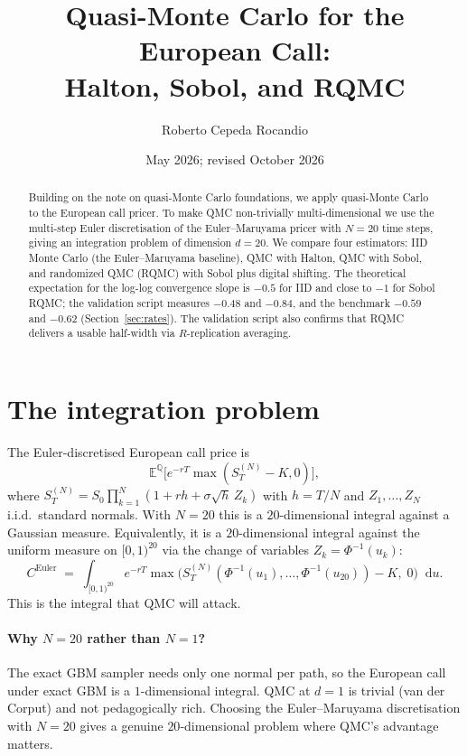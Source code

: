 \documentclass[11pt,a4paper]{article}
\title{Quasi-Monte Carlo for the European Call:\\
       Halton, Sobol, and RQMC}
\author{Roberto Cepeda Rocandio}
\date{May 2026; revised October 2026}
\theoremstyle{plain}
\theoremstyle{definition}
\theoremstyle{remark}
\newcommand{\E}{\mathbb{E}}
\newcommand{\Q}{\mathbb{Q}}
\newcommand{\dd}{\mathop{}\!\mathrm{d}}
\begin{document}
\maketitle

\begin{abstract}
Building on the note on quasi-Monte Carlo foundations, we apply
quasi-Monte Carlo to the European call pricer. To make QMC
non-trivially multi-dimensional we use the multi-step Euler
discretisation of the Euler--Maruyama pricer with $N = 20$ time steps,
giving an integration problem of dimension $d = 20$. We compare four
estimators: IID Monte Carlo (the Euler--Maruyama baseline), QMC with
Halton, QMC with Sobol, and randomized QMC (RQMC) with Sobol plus
digital shifting. The theoretical expectation for the log-log
convergence slope is $-0.5$ for IID and close to $-1$ for Sobol
RQMC; the validation script measures $-0.48$ and $-0.84$, and the
benchmark $-0.59$ and $-0.62$ (Section~\ref{sec:rates}). The
validation script also confirms that RQMC delivers a usable
half-width via $R$-replication averaging.
\end{abstract}

\tableofcontents

\section{The integration problem}
\label{sec:integration-problem}

The Euler-discretised European call price is
\begin{equation}
\E^\Q\bigl[e^{-rT} \max(S_T^{(N)} - K, 0)\bigr],
\end{equation}
where $S_T^{(N)} = S_0 \prod_{k=1}^N (1 + r h + \sigma \sqrt h \, Z_k)$
with $h = T/N$ and $Z_1, \ldots, Z_N$ i.i.d.\ standard normals. With
$N = 20$ this is a $20$-dimensional integral against a Gaussian
measure. Equivalently, it is a $20$-dimensional integral against
the uniform measure on $[0, 1)^{20}$ via the change of variables
$Z_k = \Phi^{-1}(u_k)$:
\begin{equation}
C^{\mathrm{Euler}} \;=\; \int_{[0, 1)^{20}}
e^{-rT} \max\bigl(S_T^{(N)}(\Phi^{-1}(u_1), \ldots, \Phi^{-1}(u_{20}))
                  - K,\; 0\bigr) \dd u.
\end{equation}
This is the integral that QMC will attack.

\paragraph{Why $N = 20$ rather than $N = 1$?} The exact GBM sampler
needs only one normal per path, so the European call
under exact GBM is a $1$-dimensional integral. QMC at $d = 1$ is
trivial (van der Corput) and not pedagogically rich. Choosing the
Euler--Maruyama discretisation with $N = 20$ gives a
genuine $20$-dimensional problem where QMC's advantage matters.
\end{document}
